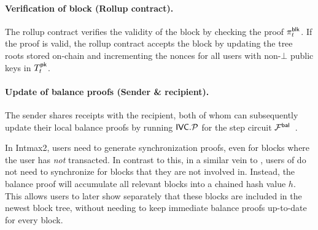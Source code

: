 \paragraph{Verification of block (Rollup contract).}

The rollup contract verifies the validity of the block by checking the proof $\pi^\mathsf{blk}_t$.
If the proof is valid, the rollup contract accepts the block by updating the tree roots stored on-chain and incrementing the nonces for all users with non-$\bot$ public keys in $T^{\mathsf{pk}}_{t}$.

\paragraph{Update of balance proofs (Sender \& recipient).}

The sender shares receipts with the recipient, both of whom can subsequently update their local balance proofs by running $\mathsf{\mathsf{IVC}.\mathcal{P}}$
for the step circuit $\mathcal{F}^\mathsf{bal}$~.

In Intmax2, users need to generate synchronization proofs, even for blocks where the user has \textit{not} transacted.
In contrast to this, in a similar vein to \PlasmaFold, users of \Protocol do not need to synchronize for blocks that they are not involved in.
Instead, the balance proof will accumulate all relevant blocks into a chained hash value $h$.
This allows users to later show separately that these blocks are included in the newest block tree, without needing to keep immediate balance proofs up-to-date for every block.

